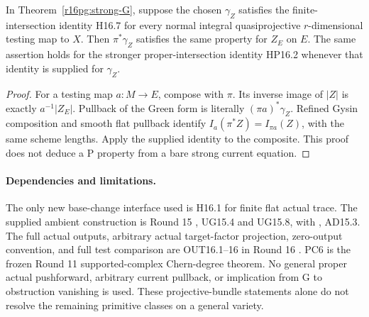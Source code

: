 \begin{corollary}
\label{r16pg:P}
In Theorem~\ref{r16pg:strong-G}, suppose the chosen $\gamma_Z$
satisfies the finite-intersection identity H16.7 for every normal
integral quasiprojective $r$-dimensional testing map to $X$.
Then $\pi^*\gamma_Z$ satisfies the same property for $Z_E$ on $E$.
The same assertion holds for the stronger proper-intersection
identity HP16.2 whenever that identity is supplied for $\gamma_Z$.
\end{corollary}

\begin{proof}
For a testing map $a:M\to E$, compose with $\pi$. Its inverse
image of $|Z|$ is exactly $a^{-1}|Z_E|$. Pullback of the Green
form is literally $(\pi a)^*\gamma_Z$. Refined Gysin composition
and smooth flat pullback identify
$I_a(\pi^*Z)=I_{\pi a}(Z)$, with the same scheme lengths. Apply
the supplied identity to the composite. This proof does not
deduce a P property from a bare strong current equation.
\end{proof}

\paragraph{Dependencies and limitations.}
The only new base-change interface used is H16.1 for finite flat
actual trace. The supplied ambient construction is Round 15
, UG15.4 and UG15.8,
with , AD15.3.
The full actual outputs, arbitrary actual target-factor projection,
zero-output convention, and full test comparison are OUT16.1--16
in Round 16 .
PC6 is the frozen Round 11 supported-complex Chern-degree theorem.
No general proper actual pushforward, arbitrary current pullback,
or implication from G to obstruction vanishing is used. These
projective-bundle statements alone do not resolve the remaining
primitive classes on a general variety.
